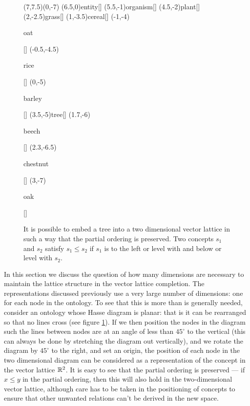\begin{figure}
\begin{center}
\begin{graph}(7,7.5)(0,-7)
(6.5,0){entity}[]
(5.5,-1){organism}[]
(4.5,-2){plant}[]
	(2,-2.5){grass}[]
	(1,-3.5){cereal}[]
		(-1,-4){\rule[-0.5ex]{0pt}{2.1ex}oat}[]
		(-0.5,-4.5){\rule[-0.5ex]{0pt}{2.1ex}rice}[]
		(0,-5){\rule[-0.5ex]{0pt}{2.1ex}barley}[]
	(3.5,-5){tree}[]
		(1.7,-6){\rule{0pt}{2ex}beech}[]
		(2.3,-6.5){\rule{0pt}{2ex}chestnut}[]
		(3,-7){\rule{0pt}{2ex}oak}[]



\end{graph}
\end{center}
\caption{It is possible to embed a tree into a two dimensional vector lattice in such a way that the partial ordering is preserved. Two concepts $s_1$ and $s_2$ satisfy $s_1 \le s_2$ if $s_1$ is to the left or level with and below or level with $s_2$.}
\label{plant-taxonomy-rot}
\end{figure}


In this section we discuss the question of how many dimensions are necessary to maintain the lattice structure in the vector lattice completion. The representations discussed previously use a very large number of dimensions: one for each node in the ontology. To see that this is more than is generally needed, consider an ontology whose Hasse diagram is planar: that is it can be rearranged so that no lines cross (see figure \ref{plant-taxonomy-rot}). If we then position the nodes in the diagram such the lines between nodes are at an angle of less than $45^\circ$ to the vertical (this can always be done by stretching the diagram out vertically), and we rotate the diagram by $45^\circ$ to the right, and set an origin, the position of each node in the two dimensional diagram can be considered as a representation of the concept in the vector lattice $\mathbb{R}^2$. It is easy to see that the partial ordering is preserved --- if $x\le y$ in the partial ordering, then this will also hold in the two-dimensional vector lattice, although care has to be taken in the positioning of concepts to ensure that other unwanted relations can't be derived in the new space.

